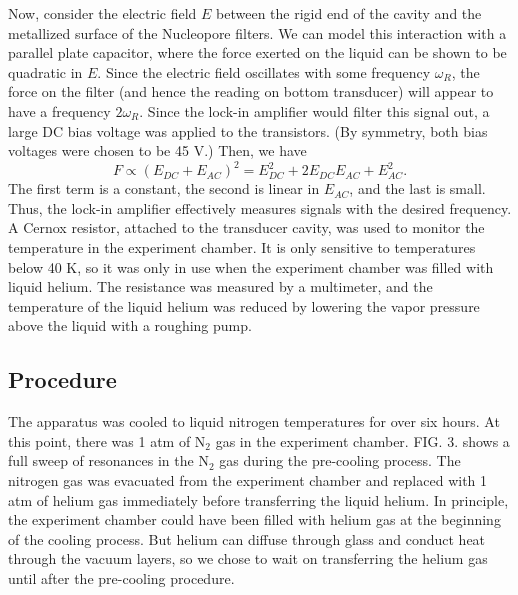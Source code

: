\documentclass[prb,aps,twocolumn,showpacs,10pt]{revtex4-1}
\begin{document}
Now, consider the electric field $E$ between the rigid end of the cavity and the metallized surface of the Nucleopore filters. We can model this interaction with a parallel plate capacitor, where the force exerted on the liquid can be shown to be quadratic in $E$\cite{phy}. Since the electric field oscillates with some frequency $\omega_R$, the force on the filter (and hence the reading on bottom transducer) will appear to have a frequency $2\omega_R$. Since the lock-in amplifier would filter this signal out, a large DC bias voltage was applied to the transistors. (By symmetry, both bias voltages were chosen to be 45 V.) Then, we have
\begin{equation}
F\propto (E_{DC}+E_{AC})^2 = E_{DC}^2 + 2E_{DC}E_{AC} + E_{AC}^2.
\end{equation}
The first term is a constant, the second is linear in $E_{AC}$, and the last is small. Thus, the lock-in amplifier effectively measures signals with the desired frequency. \\

A Cernox resistor, attached to the transducer cavity, was used to monitor the temperature in the experiment chamber. It is only sensitive to temperatures below 40 K, so it was only in use when the experiment chamber was filled with liquid helium. The resistance was measured by a multimeter, and the temperature of the liquid helium was reduced by lowering the vapor pressure above the liquid with a roughing pump. 

\subsection{Procedure}

The apparatus was cooled to liquid nitrogen temperatures for over six hours. At this point, there was 1 atm of N$_2$ gas in the experiment chamber. FIG. 3. shows a full sweep of resonances in the N$_2$ gas during the pre-cooling process. The nitrogen gas was evacuated from the experiment chamber and replaced with 1 atm of helium gas immediately before transferring the liquid helium. In principle, the experiment chamber could have been filled with helium gas at the beginning of the cooling process. But helium can diffuse through glass and conduct heat through the vacuum layers, so we chose to wait on transferring the helium gas until after the pre-cooling procedure.\\
\end{document}
